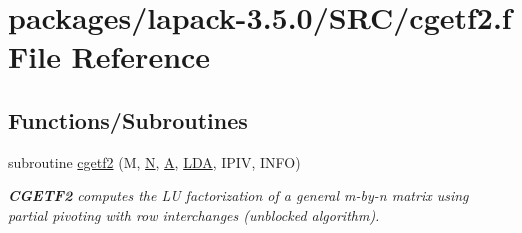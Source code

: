 \hypertarget{cgetf2_8f}{}\section{packages/lapack-\/3.5.0/\+S\+R\+C/cgetf2.f File Reference}
\label{cgetf2_8f}
\subsection*{Functions/\+Subroutines}
\begin{DoxyCompactItemize}
\item 
subroutine \hyperlink{group__complexGEcomputational_gad3da89f6345c89a215bb9010da688a8b}{cgetf2} (M, \hyperlink{polmisc_8c_a0240ac851181b84ac374872dc5434ee4}{N}, \hyperlink{classA}{A}, \hyperlink{example__user_8c_ae946da542ce0db94dced19b2ecefd1aa}{L\+D\+A}, I\+P\+I\+V, I\+N\+F\+O)
\begin{DoxyCompactList}\small\item\em {\bfseries C\+G\+E\+T\+F2} computes the L\+U factorization of a general m-\/by-\/n matrix using partial pivoting with row interchanges (unblocked algorithm). \end{DoxyCompactList}\end{DoxyCompactItemize}
